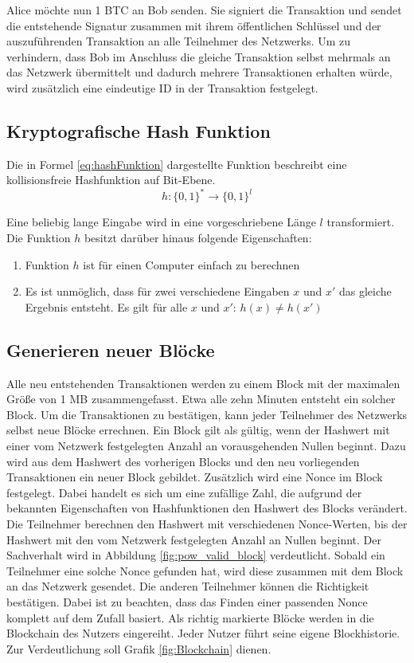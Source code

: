 Alice möchte nun 1 BTC an Bob senden. Sie signiert die Transaktion und sendet die entstehende Signatur zusammen mit ihrem öffentlichen Schlüssel und der auszuführenden Transaktion an alle Teilnehmer des Netzwerks. Um zu verhindern, dass Bob im Anschluss die gleiche Transaktion selbst mehrmals an das Netzwerk übermittelt und dadurch mehrere Transaktionen erhalten würde, wird zusätzlich eine eindeutige ID in der Transaktion festgelegt. \cite{Nakamoto.2009} \cite{Nielsen.2013} 

\subsection{Kryptografische Hash Funktion}
Die in Formel \eqref{eq:hashFunktion} dargestellte Funktion beschreibt eine kollisionsfreie Hashfunktion auf Bit-Ebene.
\begin{equation}
h : \{0,1\}^* \rightarrow \{0,1\}^l
\label{eq:hashFunktion}
\end{equation}

Eine beliebig lange Eingabe wird in eine vorgeschriebene Länge $l$ transformiert. Die Funktion $h$ besitzt darüber hinaus  folgende Eigenschaften:

\begin{enumerate}
 \item Funktion $h$ ist für einen Computer einfach zu berechnen
 \item Es ist unmöglich, dass für zwei verschiedene Eingaben $x$ und ${x}'$  das gleiche Ergebnis entsteht. Es gilt für alle $x$ und ${x}'$: $h(x) \neq h({x}')$
\end{enumerate}
\cite{Haber.1991}

\subsection{Generieren neuer Blöcke}
\label{sec:pow_section}
Alle neu entstehenden Transaktionen werden zu einem Block mit der maximalen Größe von 1 MB zusammengefasst. Etwa alle zehn Minuten entsteht ein solcher Block. Um die Transaktionen zu bestätigen, kann jeder Teilnehmer des Netzwerks selbst neue Blöcke errechnen. Ein Block gilt als gültig, wenn der Hashwert mit einer vom Netzwerk festgelegten Anzahl an vorausgehenden Nullen beginnt. Dazu wird aus dem Hashwert des vorherigen Blocks und den neu vorliegenden Transaktionen ein neuer Block gebildet. Zusätzlich wird eine Nonce im Block festgelegt. Dabei handelt es sich um eine zufällige Zahl, die aufgrund der bekannten Eigenschaften von Hashfunktionen den Hashwert des Blocks verändert. Die Teilnehmer berechnen den Hashwert mit verschiedenen Nonce-Werten, bis der Hashwert mit den vom Netzwerk festgelegten Anzahl an Nullen beginnt. Der Sachverhalt wird in Abbildung \eqref{fig:pow_valid_block} verdeutlicht. Sobald ein Teilnehmer eine solche Nonce gefunden hat, wird diese zusammen mit dem Block an das Netzwerk gesendet. Die anderen Teilnehmer können die Richtigkeit bestätigen. Dabei ist zu beachten, dass das Finden einer passenden Nonce komplett auf dem Zufall basiert. Als richtig markierte Blöcke werden in die Blockchain des Nutzers eingereiht. Jeder Nutzer führt seine eigene Blockhistorie. Zur Verdeutlichung soll Grafik \eqref{fig:Blockchain} dienen. \cite{Nielsen.2013}


